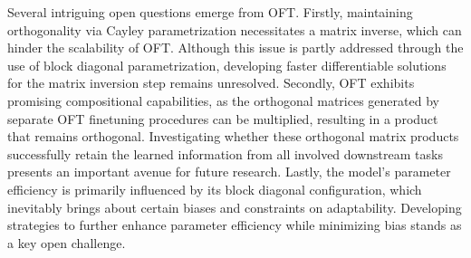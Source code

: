 Several intriguing open questions emerge from OFT. Firstly, maintaining orthogonality via Cayley parametrization necessitates a matrix inverse, which can hinder the scalability of OFT. Although this issue is partly addressed through the use of block diagonal parametrization, developing faster differentiable solutions for the matrix inversion step remains unresolved. Secondly, OFT exhibits promising compositional capabilities, as the orthogonal matrices generated by separate OFT finetuning procedures can be multiplied, resulting in a product that remains orthogonal. Investigating whether these orthogonal matrix products successfully retain the learned information from all involved downstream tasks presents an important avenue for future research. Lastly, the model's parameter efficiency is primarily influenced by its block diagonal configuration, which inevitably brings about certain biases and constraints on adaptability. Developing strategies to further enhance parameter efficiency while minimizing bias stands as a key open challenge.